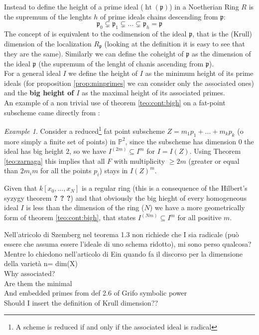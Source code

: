 \documentclass[]{book}
\theoremstyle{plain}
\theoremstyle{remark}
\newtheorem{ex}[rem]{Example}
\theoremstyle{definition}
\newcommand{\PP}{\mathbb{P}}
\newcommand{\p}{\mathfrak{p}}
\newcommand{\cont}[2]{ I^{(#1)} \subseteq I^{#2}}
\DeclareMathOperator{\hgt}{ht}
\begin{document}
	Instead to define the height of a prime ideal ($\hgt ( \p )$) in a Noetherian Ring $ R $ is the supremum of the lenghts $ h $ of prime ideals chains descending from $ \p $:
	\begin{equation}\label{eq:chain}
		\p_0 \subsetneq \p_1 \subsetneq ... \subsetneq \p_{h} = \p
	\end{equation}
	The concept of is equivalent to the codimension of the ideal $ \p $, that is the (Krull) dimension of the localization $ R_\p $ (looking at the definition it is easy to see that they are the same). Similarly we can define the coheight of $ \p $ as the dimension of the ideal $ \p $ (the supremum of the lenght of chanis ascending from $ \p $). \\
	For a general ideal $ I $ we define the height of $ I $ as the minimum height of its prime ideals (for proposition \ref{prop:minprimes} we can consider only the associated ones) and the \textbf{big height of $ I $} as the maximal height of its associated primes. \\
	An example of a non trivial use of theorem \ref{teo:cont:bigh} on a fat-point subscheme came directly from \cite[2.3]{EinLazSmi01}:
	
	\begin{ex}\label{es:P2points}
	Consider a reduced\footnote{A scheme is reduced if and only if the associated ideal is radical} fat point subscheme $ Z = m_1 p_1 + ... +  m_k p_k$ (o more simply a finite set of points) in $ \PP^2 $, since the subscheme has dimension $ 0 $ the ideal has big height $ 2 $, so we have $ \cont{2m}{m} $ for $ I = I(Z) $. Using Theorem \ref{teo:zarnaga} this implies that all $ F $ with multiplicity $ \geq 2m $ (greater or equal than $ 2m_im $ for all the points $ p_i $) stays in $ I(Z)^m $. 
	\end{ex}
	
	Given that $ k[x_0, ... , x_N] $ is a regular ring (this is a consequence of the Hilbert's syzygy theorem \textbf{? ? ?}) and that obviously the big hieght of every homogeneous ideal $ I $ is less than the dimension of the ring ($ N $) we have a more geometrically form of theorem \ref{teo:cont:bigh}, that states $ \cont{Nm}{m} $ for all positive $ m $. %
	
	
	 
	\begin{tcolorbox}
		Nell'atricolo di Szemberg nel teorema 1.3 non richiede che I sia radicale (può essere che assuma essere l'ideale di uno schema ridotto), mi sono perso qualcosa? Mentre lo chiedono nell'articolo di Ein quando fa il discorso per la dimensione della varietà n= dim(X)\\
		Why associated?\\
		Are them the minimal\\
		And embedded primes from def 2.6 of Grifo symbolic power\\
		Should I insert the definition of Krull dimension??
	\end{tcolorbox}
	
\end{document}
